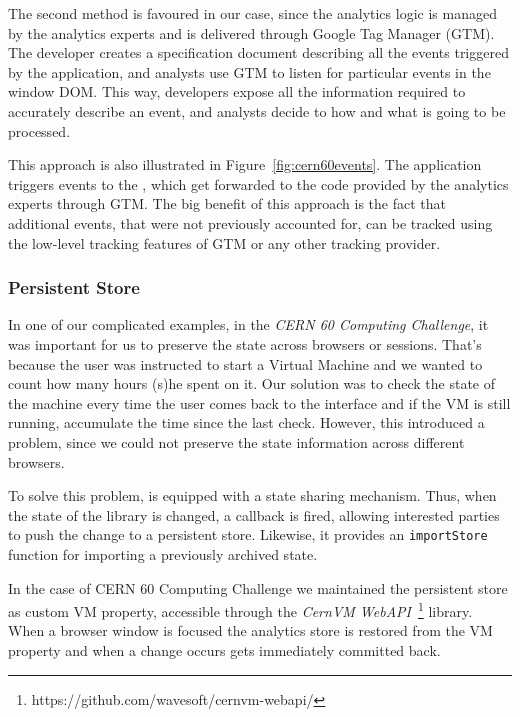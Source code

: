 The second method is favoured in our case, since the analytics logic is managed by the analytics experts and is delivered through Google Tag Manager (GTM). The developer creates a specification document describing all the events triggered by the application, and analysts use GTM to listen for particular events in the window DOM. This way, developers expose all the information required to accurately describe an event, and analysts decide to how and what is going to be processed.  

This approach is also illustrated in Figure~\ref{fig:cern60events}. The application triggers events to the \CCLTrackerJS, which get forwarded to the code provided by the analytics experts through GTM. The big benefit of this approach is the fact that additional events, that were not previously accounted for, can be tracked using the low-level tracking features of GTM or any other tracking provider.

\subsubsection{Persistent Store}

In one of our complicated examples, in the \emph{CERN 60 Computing Challenge}, it was important for us to preserve the state across browsers or sessions. That's because the user was instructed to start a Virtual Machine and we wanted to count how many hours (s)he spent on it. Our solution was to check the state of the machine every time the user comes back to the interface and if the VM is still running, accumulate the time since the last check. However, this introduced a problem, since we could not preserve the state information across different browsers.

To solve this problem, \CCLTrackerJS is equipped with a state sharing mechanism. Thus, when the state of the library is changed, a callback is fired, allowing interested parties to push the change to a persistent store. Likewise, it provides an \texttt{importStore} function for importing a previously archived state. 

In the case of CERN 60 Computing Challenge we maintained the persistent store as custom VM property, accessible through the \emph{CernVM WebAPI}~\footnote{https://github.com/wavesoft/cernvm-webapi/} library. When a browser window is focused the analytics store is restored from the VM property and when a change occurs gets immediately committed back.

